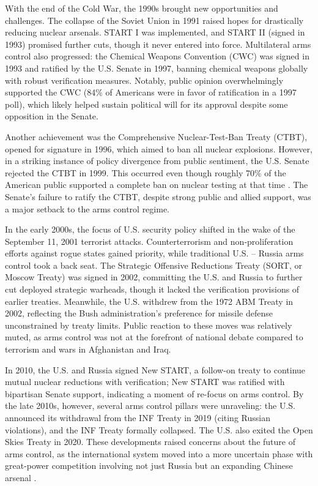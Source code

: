 \documentclass[11,5 pt]{article}
\begin{document}
    With the end of the Cold War, the 1990s brought new opportunities and challenges. The collapse of the Soviet Union in 1991 raised hopes for drastically reducing nuclear arsenals. START I was implemented, and START II (signed in 1993) promised further cuts, though it never entered into force. Multilateral arms control also progressed: the Chemical Weapons Convention (CWC) was signed in 1993 and ratified by the U.S. Senate in 1997, banning chemical weapons globally with robust verification measures. Notably, public opinion overwhelmingly supported the CWC (84\% of Americans were in favor of ratification in a 1997 poll), which likely helped sustain political will for its approval despite some opposition in the Senate. 
    
    Another achievement was the Comprehensive Nuclear-Test-Ban Treaty (CTBT), opened for signature in 1996, which aimed to ban all nuclear explosions. However, in a striking instance of policy divergence from public sentiment, the U.S. Senate rejected the CTBT in 1999. This occurred even though roughly 70\% of the American public supported a complete ban on nuclear testing at that time \cite{Carnegie1999}. The Senate’s failure to ratify the CTBT, despite strong public and allied support, was a major setback to the arms control regime. 
    
    In the early 2000s, the focus of U.S. security policy shifted in the wake of the September 11, 2001 terrorist attacks. Counterterrorism and non-proliferation efforts against rogue states gained priority, while traditional U.S. – Russia arms control took a back seat. The Strategic Offensive Reductions Treaty (SORT, or Moscow Treaty) was signed in 2002, committing the U.S. and Russia to further cut deployed strategic warheads, though it lacked the verification provisions of earlier treaties. Meanwhile, the U.S. withdrew from the 1972 ABM Treaty in 2002, reflecting the Bush administration’s preference for missile defense unconstrained by treaty limits. Public reaction to these moves was relatively muted, as arms control was not at the forefront of national debate compared to terrorism and wars in Afghanistan and Iraq. 
    
    In 2010, the U.S. and Russia signed New START, a follow-on treaty to continue mutual nuclear reductions with verification; New START was ratified with bipartisan Senate support, indicating a moment of re-focus on arms control. By the late 2010s, however, several arms control pillars were unraveling: the U.S. announced its withdrawal from the INF Treaty in 2019 (citing Russian violations), and the INF Treaty formally collapsed. The U.S. also exited the Open Skies Treaty in 2020. These developments raised concerns about the future of arms control, as the international system moved into a more uncertain phase with great-power competition involving not just Russia but an expanding Chinese arsenal \cite{AtomicReporters2019}. 
    
\end{document}
